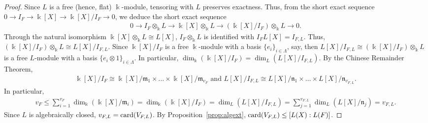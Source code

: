 \documentclass[11pt,reqno]{amsart}
\theoremstyle{definition}
\newcommand{\mbk}{\mbox{$\Bbbk$}}
\newcommand{\mfm}{\mbox{$\mathfrak{m}$}}
\newcommand{\mfn}{\mbox{$\mathfrak{n}$}}
\newcommand{\card}{\mbox{${\rm card}$}}
\begin{document}
\begin{proof}
Since $L$ is a free (hence, flat) $\mbk$-module, tensoring with $L$ preserves exactness. Thus, from
the short exact sequence $0\to I_F\to\mbk[X]\to \mbk[X]/I_F\to 0$, we deduce the short exact sequence
\begin{eqnarray*}
0\to I_F\otimes_{\Bbbk}L\to\mbk[X]\otimes_{\Bbbk}L\to (\mbk[X]/I_F)\otimes_{\Bbbk}L\to 0. 
\end{eqnarray*}
Through the natural isomorphism $\mbk[X]\otimes_{\Bbbk}L\cong L[X]$, $I_F\otimes_{\Bbbk}L$ is identified with $I_FL[X]=I_{F,L}$. Thus, $(\mbk[X]/I_F)\otimes_{\Bbbk}L\cong L[X]/I_{F,L}$. Since
$\mbk[X]/I_F$ is a free $\mbk$-module with a basis $\{e_i\}_{i\in\Lambda}$, say, then
$L[X]/I_{F,L}\cong (\mbk[X]/I_F)\otimes_{\Bbbk}L$ is a free $L$-module with a basis
$\{e_i\otimes 1\}_{i\in\Lambda}$. In particular, 
$\dim_{\Bbbk}(\mbk[X]/I_F)=\dim_L(L[X]/I_{F,L})$.
By the Chinese Remainder Theorem, 
\begin{eqnarray*}
\mbk[X]/I_F\cong \mbk[X]/\mfm_1\times\ldots\times\mbk[X]/\mfm_{v_F}\mbox{ and }L[X]/I_{F,L}\cong L[X]/\mfn_1\times\ldots\times L[X]/\mfn_{v_{F,L}}.%
\end{eqnarray*}
In particular, 
\begin{eqnarray*}
v_F\leq \sum_{i=1}^{v_F}\dim_{\Bbbk}(\mbk[X]/\mfm_i)=\dim_{\Bbbk}(\mbk[X]/I_F)=
\dim_L(L[X]/I_{F,L})=\sum_{j=1}^{v_{F,L}}\dim_L(L[X]/\mfn_j)=v_{F,L}.
\end{eqnarray*}
Since $L$ is algebraically closed, $v_{F,L}=\card(V_{F,L})$. By Proposition~\ref{prop:algext}, $\card(V_{F,L})\leq [L(X):L(F)]$.
 

\end{proof}
\end{document}
